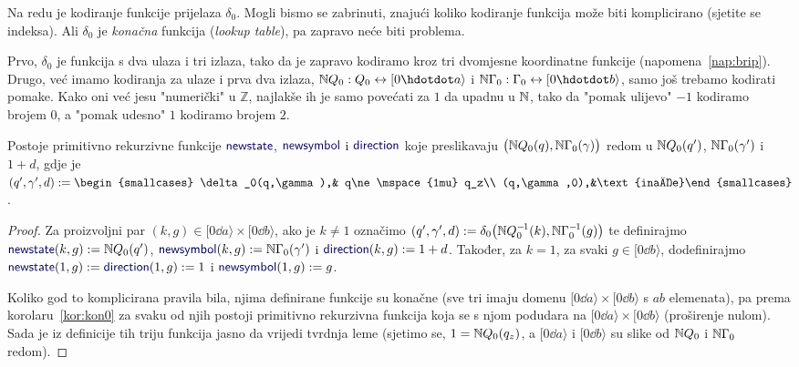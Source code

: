 Na redu je kodiranje funkcije prijelaza $\delta_0$. Mogli bismo se zabrinuti, znajući koliko kodiranje funkcija može biti komplicirano (sjetite se indeksa). Ali $\delta_0$ je \emph{konačna} funkcija (\emph{lookup table}), pa zapravo neće biti problema.

Prvo, $\delta_0$ je funkcija s dva ulaza i tri izlaza, tako da je zapravo kodiramo kroz tri dvomjesne koordinatne funkcije (napomena~\ref{nap:brip}). Drugo, već imamo kodiranja za ulaze i prva dva izlaza, $\N Q_0:Q_0\leftrightarrow[0\dd a\rangle$ i $\N\Gamma_0:\Gamma_0\leftrightarrow[0\dd b\rangle$, samo još trebamo kodirati pomake. Kako oni već jesu "numerički" u $\mathbb Z$, najlakše ih je samo povećati za $1$ da upadnu u ${\mathbb N}$, tako da "pomak ulijevo" $-1$ kodiramo brojem $0$, a "pomak udesno" $1$ kodiramo brojem $2$.

\begin{lema}[{name=[primitivna rekurzivnost funkcije prijelaza]}]\label{lm:newssdprn}
Postoje primitivno rekurzivne funkcije $\f{newstate}$, $\f{newsymbol}$ i $\f{direction}$ koje preslikavaju $\bigl({\mathbb N} Q_0(q),{\mathbb N}\Gamma_0(\gamma)\bigr)$ redom u ${\mathbb N} Q_0(q')$, ${\mathbb N}\Gamma_0(\gamma')$ i $1+d$, gdje je
$(q',\gamma',d):=\begin{smallcases}
	\delta_0(q,\gamma),& q\ne\mspace{1mu} q_z\\
(q,\gamma,0),&\text{inače}\end{smallcases}\!$.
\end{lema}
\begin{proof}
	Za proizvoljni par $(k,g)\in[0\dd a\rangle\times[0\dd b\rangle$, ako je $k\ne 1$ označimo $(q',\gamma',d):=\delta_0\bigl({\mathbb N} Q_0^{-\mspace{-2mu}1}(k),{\mathbb N}\Gamma_0^{-\mspace{-2mu}1}(g)\bigr)$ te definirajmo $\f{newstate}(k,g):=\N Q_0(q')$, $\f{newsymbol}(k,g):=\N\Gamma_0(\gamma')$ i $\f{direction}(k,g):=1+d$. Također, za $k=1$, za svaki $g\in[0\dd b\rangle$, dodefinirajmo $\f{newstate}(1,g):=\f{direction}(1,g):=1$ i $\f{newsymbol}(1,g):=g$.

Koliko god to komplicirana pravila bila, njima definirane funkcije su konačne (sve tri imaju domenu $[0\dd a\rangle\times[0\dd b\rangle$ s $ab$ elemenata), pa prema korolaru~\ref{kor:kon0} za svaku od njih postoji primitivno rekurzivna funkcija koja se s njom podudara na $[0\dd a\rangle\times[0\dd b\rangle$ (proširenje nulom). Sada je iz definicije tih triju funkcija jasno da vrijedi tvrdnja leme (sjetimo se, $1={\mathbb N} Q_0(q_z)$, a $[0\dd a\rangle$ i $[0\dd b\rangle$ su slike od ${\mathbb N} Q_0$ i ${\mathbb N}\Gamma_0$ redom).
\end{proof}


